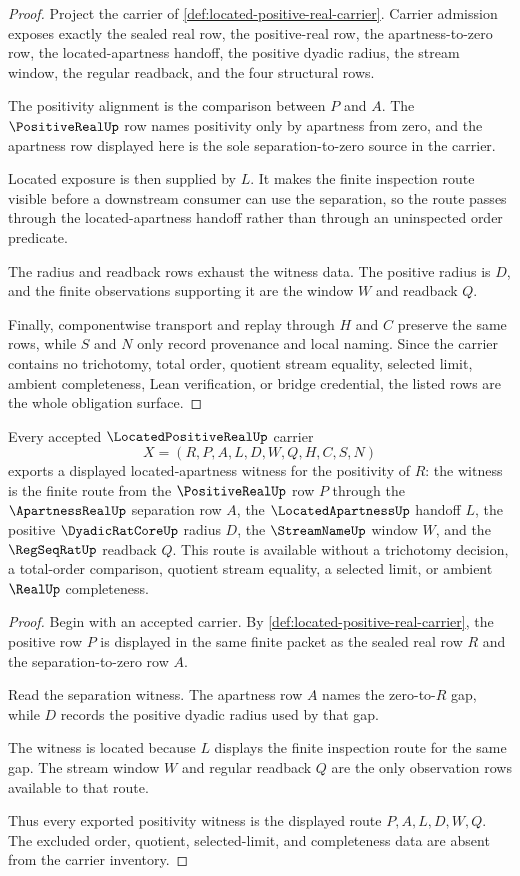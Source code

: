 \begin{proof}
Project the carrier of \autoref{def:located-positive-real-carrier}. Carrier admission exposes exactly the sealed real row, the positive-real row, the apartness-to-zero row, the located-apartness handoff, the positive dyadic radius, the stream window, the regular readback, and the four structural rows.

The positivity alignment is the comparison between $P$ and $A$. The $\PositiveRealUp$ row names positivity only by apartness from zero, and the apartness row displayed here is the sole separation-to-zero source in the carrier.

Located exposure is then supplied by $L$. It makes the finite inspection route visible before a downstream consumer can use the separation, so the route passes through the located-apartness handoff rather than through an uninspected order predicate.

The radius and readback rows exhaust the witness data. The positive radius is $D$, and the finite observations supporting it are the window $W$ and readback $Q$.

Finally, componentwise transport and replay through $H$ and $C$ preserve the same rows, while $S$ and $N$ only record provenance and local naming. Since the carrier contains no trichotomy, total order, quotient stream equality, selected limit, ambient completeness, Lean verification, or bridge credential, the listed rows are the whole obligation surface.
\end{proof}

\begin{theorem}
\label{thm:located-positive-real-apartness-witness}
Every accepted $\LocatedPositiveRealUp$ carrier
$$
X=(R,P,A,L,D,W,Q,H,C,S,N)
$$
exports a displayed located-apartness witness for the positivity of $R$: the witness is the finite route from the $\PositiveRealUp$ row $P$ through the $\ApartnessRealUp$ separation row $A$, the $\LocatedApartnessUp$ handoff $L$, the positive $\DyadicRatCoreUp$ radius $D$, the $\StreamNameUp$ window $W$, and the $\RegSeqRatUp$ readback $Q$. This route is available without a trichotomy decision, a total-order comparison, quotient stream equality, a selected limit, or ambient $\RealUp$ completeness.
\end{theorem}
\begin{proof}
Begin with an accepted carrier. By \autoref{def:located-positive-real-carrier}, the positive row $P$ is displayed in the same finite packet as the sealed real row $R$ and the separation-to-zero row $A$.

Read the separation witness. The apartness row $A$ names the zero-to-$R$ gap, while $D$ records the positive dyadic radius used by that gap.

The witness is located because $L$ displays the finite inspection route for the same gap. The stream window $W$ and regular readback $Q$ are the only observation rows available to that route.

Thus every exported positivity witness is the displayed route $P,A,L,D,W,Q$. The excluded order, quotient, selected-limit, and completeness data are absent from the carrier inventory.
\end{proof}

